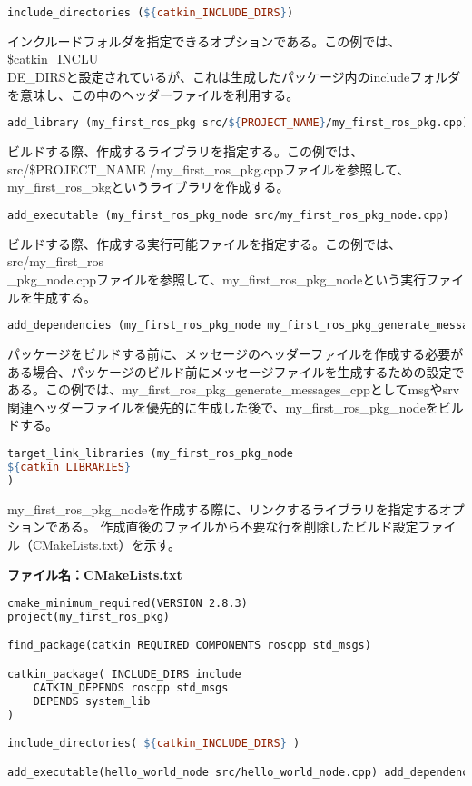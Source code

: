 \begin{lstlisting}[language=make]
include_directories (${catkin_INCLUDE_DIRS})
\end{lstlisting}

インクルードフォルダを指定できるオプションである。この例では、\${catkin\_INCLU\\DE\_DIRS}と設定されているが、これは生成したパッケージ内のincludeフォルダを意味し、この中のヘッダーファイルを利用する。

\begin{lstlisting}[language=make]
add_library (my_first_ros_pkg src/${PROJECT_NAME}/my_first_ros_pkg.cpp)
\end{lstlisting}

ビルドする際、作成するライブラリを指定する。この例では、src/\${PROJECT\_NAME} /my\_first\_ros\_pkg.cppファイルを参照して、my\_first\_ros\_pkgというライブラリを作成する。

\begin{lstlisting}[language=make]
add_executable (my_first_ros_pkg_node src/my_first_ros_pkg_node.cpp)
\end{lstlisting}

ビルドする際、作成する実行可能ファイルを指定する。この例では、src/my\_first\_ros\\\_pkg\_node.cppファイルを参照して、my\_first\_ros\_pkg\_nodeという実行ファイルを生成する。

\begin{lstlisting}[language=make]
add_dependencies (my_first_ros_pkg_node my_first_ros_pkg_generate_messages_cpp)
\end{lstlisting}

パッケージをビルドする前に、メッセージのヘッダーファイルを作成する必要がある場合、パッケージのビルド前にメッセージファイルを生成するための設定である。この例では、my\_first\_ros\_pkg\_generate\_messages\_cppとしてmsgやsrv関連ヘッダーファイルを優先的に生成した後で、my\_first\_ros\_pkg\_nodeをビルドする。

\begin{lstlisting}[language=make]
target_link_libraries (my_first_ros_pkg_node
${catkin_LIBRARIES}
)
\end{lstlisting}

my\_first\_ros\_pkg\_nodeを作成する際に、リンクするライブラリを指定するオプションである。
作成直後のファイルから不要な行を削除したビルド設定ファイル（CMakeLists.txt）を示す。

\noindent\textbf{ファイル名：CMakeLists.txt}
\begin{lstlisting}[language=make]
cmake_minimum_required(VERSION 2.8.3)
project(my_first_ros_pkg)

find_package(catkin REQUIRED COMPONENTS roscpp std_msgs)

catkin_package( INCLUDE_DIRS include
    CATKIN_DEPENDS roscpp std_msgs
    DEPENDS system_lib
)

include_directories( ${catkin_INCLUDE_DIRS} )

add_executable(hello_world_node src/hello_world_node.cpp) add_dependencies(hello_world_node my_first_ros_pkg_generate_messages_cpp) target_link_libraries(hello_world_node ${catkin_LIBRARIES})
\end{lstlisting}

